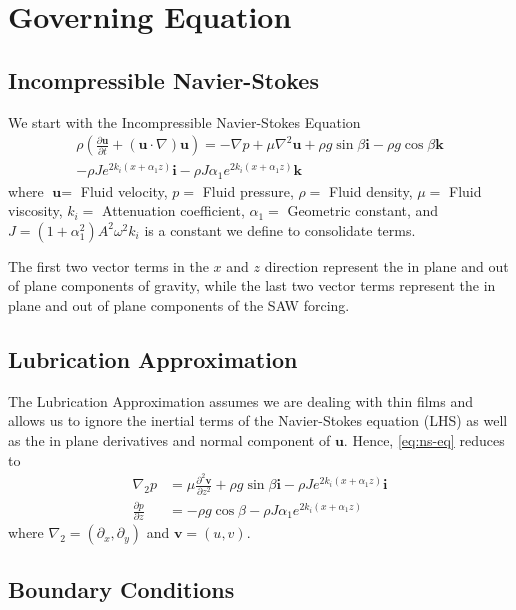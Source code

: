 \documentclass[compress, xcolor=dvipsnames]{beamer}
\newcommand{\vect}[1]{\ensuremath{\textbf{#1}}}
\newcommand{\vecu}{\textbf{u}}
\newcommand{\grad}{\ensuremath{\nabla}}
\newcommand{\pderiv}[2]{\ensuremath{\frac{\partial #1}{\partial #2}}}
\newcommand{\lrp}[1]{\left( #1 \right)}
\newcommand{\cexpz}{\ensuremath{e^{2k_i \lrp{x + \alpha_1 z}}}}
\begin{document}
    \section{Governing Equation}
    \subsection{Incompressible Navier-Stokes}
    \begin{frame}
        We start with the Incompressible Navier-Stokes Equation
        \begin{multline}
            \rho \lrp{\pderiv{\vecu}{t} + \lrp{\vecu \cdot \grad}\vecu} = -\grad p
            + \mu \grad^2 \vecu + \rho g \sin \beta \vect{i} - \rho g \cos \beta \vect{k} \\
            - \rho J e^{2k_i \lrp{x + \alpha_1 z}} \vect{i} - \rho J \alpha_1 e^{2k_i \lrp{x + \alpha_1 z}} \vect{k}
            \label{eq:ns-eq}
        \end{multline}
        where $\vect{u} =$ Fluid velocity, $p =$ Fluid pressure, $\rho =$ Fluid density, $\mu =$ Fluid viscosity, 
        $k_i =$  Attenuation coefficient, $\alpha_1 =$ Geometric constant, and $J = \lrp{1 + \alpha_1^2}A^2\omega^2 k_i$
        is a constant we define to consolidate terms. 

        The first two vector terms in the $x$ and $z$ direction represent the in plane and out of plane 
        components of gravity, while the last two vector terms represent the in plane and out of plane 
        components of the SAW forcing. 
    \end{frame}
    \subsection{Lubrication Approximation}
    \begin{frame}
        The Lubrication Approximation assumes we are dealing with thin films
        and allows us to ignore the inertial terms of the Navier-Stokes equation (LHS) as well as the in plane
        derivatives and normal component of $\vecu$. Hence, \cref{eq:ns-eq} reduces to 
        \begin{equation}
            \begin{aligned}
                \grad_2 p &= \mu \frac{\partial^2 \vect{v}}{\partial z^2} + \rho g \sin\beta \vect{i} - \rho J\cexpz\vect{i}\\
                \pderiv{p}{z} &= -\rho g \cos\beta - \rho J\alpha_1 \cexpz
            \end{aligned}
            \label{eq:lub_approx}
        \end{equation}
        where $\grad_2 = \lrp{\partial_x, \partial_y}$ and $\vect{v} = \lrp{u, v}$. 
    \end{frame}
    \subsection{Boundary Conditions}
    \begin{frame}

    \end{frame}

    
\end{document}
